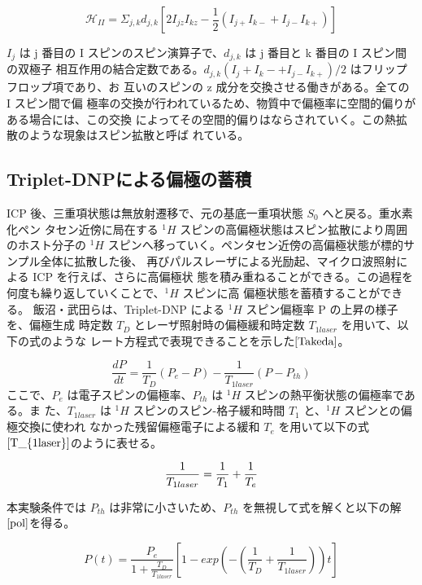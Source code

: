 \begin{equation}
  \mathcal{H}_{II}={\displaystyle \Sigma_{j,k}}d_{j,k}[2I_{jz}I_{kz}-\frac{1}{2}(I_{j+}I_{k-}+I_{j-}I_{k+})]
  \label{Hamiltonian}
\end{equation}

$I_j$ は j 番目の I スピンのスピン演算子で、$d_{j,k}$ は j 番目と k 番目の I スピン間の双極子
相互作用の結合定数である。$d_{j,k}(I_j+I_k− + I_{j−}I_{k+})/2$ はフリップフロップ項であり、お
互いのスピンの z 成分を交換させる働きがある。全ての I スピン間で偏
極率の交換が行われているため、物質中で偏極率に空間的偏りがある場合には、この交換
によってその空間的偏りはならされていく。この熱拡散のような現象はスピン拡散と呼ば
れている。

\subsection{Triplet-DNPによる偏極の蓄積}
ICP 後、三重項状態は無放射遷移で、元の基底一重項状態 $S_0$ へと戻る。重水素化ペン
タセン近傍に局在する ${}^1H$ スピンの高偏極状態はスピン拡散により周囲のホスト分子の
${}^1H$ スピンへ移っていく。ペンタセン近傍の高偏極状態が標的サンプル全体に拡散した後、
再びパルスレーザによる光励起、マイクロ波照射による ICP を行えば、さらに高偏極状
態を積み重ねることができる。この過程を何度も繰り返していくことで、${}^1H$ スピンに高
偏極状態を蓄積することができる。
飯沼・武田らは、Triplet-DNP による ${}^1H$ スピン偏極率 P の上昇の様子を、偏極生成
時定数 ${T_D}$ とレーザ照射時の偏極緩和時定数 $T_{1laser}$ を用いて、以下の式のような
レート方程式で表現できることを示した$\cite{Takeda}$。

\begin{equation}
  \frac{dP}{dt}=\frac{1}{T_D}(P_e-P)-\frac{1}{T_{1laser}}(P-P_{th})
  \label{pol_dif}
\end{equation}
ここで、$P_e$ は電子スピンの偏極率、$P_{th}$ は ${}^1H$ スピンの熱平衡状態の偏極率である。ま
た、$T_{1laser}$ は ${}^1H$ スピンのスピン-格子緩和時間 $T_1$ と、${}^1H$ スピンとの偏極交換に使われ
なかった残留偏極電子による緩和 $T_e$ を用いて以下の式$\ref{T_{1laser}}$のように表せる。

\begin{equation}
  \frac{1}{T_{1laser}}=\frac{1}{T_1}+\frac{1}{T_e}
  \label{T_{1laser}}
\end{equation}

本実験条件では $P_{th}$ は非常に小さいため、$P_{th}$ を無視して式を解くと以下の解$\ref{pol}$を得る。

\begin{equation}
  P(t)=\frac{P_e}{1+\frac{T_D}{T_{1laser}}}\left[1-exp\left(-\left(\frac{1}{T_D}+\frac{1}{T_{1laser}}\right)\right)t\right]
  \label{pol}
\end{equation}


